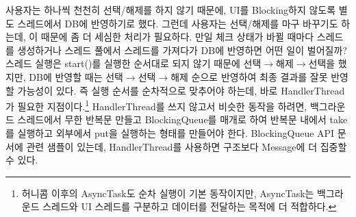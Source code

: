 사용자는 하나씩 천천히 선택/해제를 하지 않기 때문에, UI를 Blocking하지 않도록 별도 스레드에서 DB에 반영하기로 했다.
그런데 사용자는 선택/해제를 마구 바꾸기도 하는데, 이 때문에 좀 더 세심한 처리가 필요하다.
만일 체크 상태가 바뀔 때마다 스레드를 생성하거나 스레드 풀에서 스레드를 가져다가 DB에 반영하면 어떤 일이 벌어질까? 스레드 실행은 start()를 실행한 순서대로 되지 않기 때문에 선택$\rightarrow$해제$\rightarrow$선택을 했지만, DB에 반영할 때는 선택$\rightarrow$선택$\rightarrow$해제 순으로 반영하여 최종 결과를 잘못 반영할 가능성이 있다. 
즉 실행 순서를 순차적으로 맞추어야 하는데, 바로 HandlerThread가 필요한 지점이다.\footnote{허니콤 이후의 AsyncTask도 순차 실행이 기본 동작이지만, AsyncTask는 백그라운드 스레드와 UI 스레드를 구분하고 데이터를 전달하는 목적에 더 적합하다.}
HandlerThread를 쓰지 않고서 비슷한 동작을 하려면, 백그라운드 스레드에서 무한 반복문 만들고 BlockingQueue를 매개로 하여 반복문 내에서 take를 실행하고 외부에서 put을 실행하는 형태를 만들어야 한다.
BlockingQueue API 문서에 관련 샘플이 있는데, HandlerThread를 사용하면 구조보다 Message에 더 집중할 수 있다.\\

